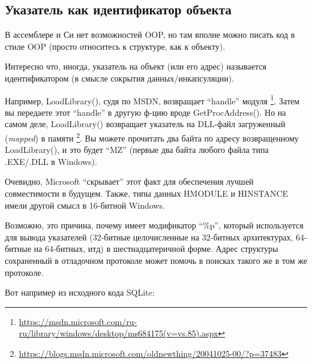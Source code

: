\subsection{Указатель как идентификатор объекта}

В ассемблере и Си нет возможностей \ac{OOP}, но там вполне можно писать код в стиле \ac{OOP}
(просто относитесь к структуре, как к объекту).

Интересно что, иногда, указатель на объект (или его адрес) называется идентификатором (в смысле сокрытия данных/инкапсуляции).

Например, LoadLibrary(), судя по \ac{MSDN}, возвращает ``handle'' модуля
\footnote{\url{https://msdn.microsoft.com/ru-ru/library/windows/desktop/ms684175(v=vs.85).aspx}}.
Затем вы передаете этот ``handle'' в другую ф-цию вроде GetProcAddress().
Но на самом деле, LoadLibrary() возвращает указатель на DLL-файл загруженный (\emph{mapped}) в памяти
\footnote{\url{https://blogs.msdn.microsoft.com/oldnewthing/20041025-00/?p=37483}}.
Вы можете прочитать два байта по адресу возвращенному LoadLibrary(), и это будет ``MZ'' (первые два байта любого файла
типа .EXE/.DLL в Windows).

Очевидно, Microsoft ``скрывает'' этот факт для обеспечения лучшей совместимости в будущем.
Также, типы данных HMODULE и HINSTANCE имели другой смысл в 16-битной Windows.

Возможно, это причина, почему \printf имеет модификатор ``\%p'', который используется для вывода указателей (32-битные
целочисленные на 32-битных архитектурах, 64-битные на 64-битных, итд) в шестнадцатеричной форме.
Адрес структуры сохраненный в отладочном протоколе может помочь в поисках такого же в том же протоколе.

Вот например из исходного кода SQLite:

